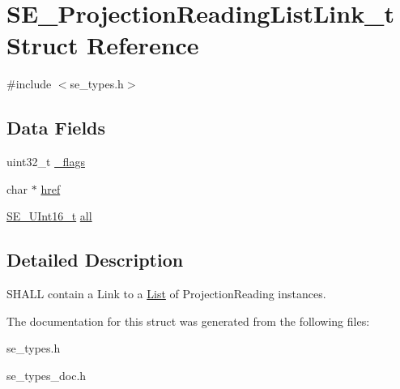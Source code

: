 \hypertarget{structSE__ProjectionReadingListLink__t}{}\section{S\+E\+\_\+\+Projection\+Reading\+List\+Link\+\_\+t Struct Reference}
\label{structSE__ProjectionReadingListLink__t}


{\ttfamily \#include $<$se\+\_\+types.\+h$>$}

\subsection*{Data Fields}
\begin{DoxyCompactItemize}
\item 
uint32\+\_\+t \hyperlink{group__ProjectionReadingListLink_ga28822e53e74267ba142e26907d8f61ed}{\+\_\+flags}
\item 
char $\ast$ \hyperlink{group__ProjectionReadingListLink_ga20949473f08a344c7982015365a5ab35}{href}
\item 
\hyperlink{group__UInt16_gac68d541f189538bfd30cfaa712d20d29}{S\+E\+\_\+\+U\+Int16\+\_\+t} \hyperlink{group__ProjectionReadingListLink_ga7df090bbabfbd3611d690fac792b316e}{all}
\end{DoxyCompactItemize}


\subsection{Detailed Description}
S\+H\+A\+LL contain a Link to a \hyperlink{structList}{List} of Projection\+Reading instances. 

The documentation for this struct was generated from the following files\+:\begin{DoxyCompactItemize}
\item 
se\+\_\+types.\+h\item 
se\+\_\+types\+\_\+doc.\+h\end{DoxyCompactItemize}
